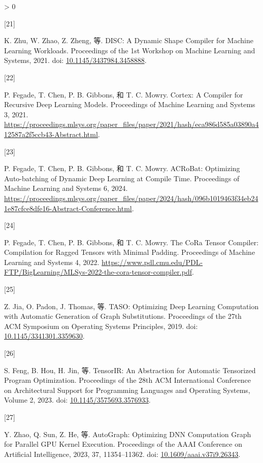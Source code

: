 \documentclass[
  UTF8,
  zihao=5]{ctexart}
\newlength{\cslhangindent}
\newlength{\csllabelwidth}
\newenvironment{CSLReferences}[2] %
 {%
  \setlength{\parindent}{0pt}
  \ifodd #1 \everypar{\setlength{\hangindent}{\cslhangindent}}\ignorespaces\fi
  \ifnum #2 > 0
  \setlength{\parskip}{#2\baselineskip}
  \fi
 }%
 {}
\newcommand{\CSLLeftMargin}[1]{\parbox[t]{\csllabelwidth}{#1}}
\newcommand{\CSLRightInline}[1]{\parbox[t]{\linewidth - \csllabelwidth}{#1}\par}
\begin{document}
\begin{CSLReferences}{0}{0}
\leavevmode{}%
\CSLLeftMargin{{[}21{]} }%
\CSLRightInline{K. Zhu, W. Zhao, Z. Zheng, 等. {DISC: A Dynamic Shape
Compiler for Machine Learning Workloads}. Proceedings of the 1st
Workshop on Machine Learning and Systems, 2021. doi:
\href{https://doi.org/10.1145/3437984.3458888}{10.1145/3437984.3458888}.}

\leavevmode{}%
\CSLLeftMargin{{[}22{]} }%
\CSLRightInline{P. Fegade, T. Chen, P. B. Gibbons, 和 T. C. Mowry.
{Cortex: A Compiler for Recursive Deep Learning Models}. Proceedings of
Machine Learning and Systems 3, 2021.
\url{https://proceedings.mlsys.org/paper_files/paper/2021/hash/eca986d585a03890a412587a2f5ccb43-Abstract.html}.}

\leavevmode{}%
\CSLLeftMargin{{[}23{]} }%
\CSLRightInline{P. Fegade, T. Chen, P. B. Gibbons, 和 T. C. Mowry.
{ACRoBat: Optimizing Auto-batching of Dynamic Deep Learning at Compile
Time}. Proceedings of Machine Learning and Systems 6, 2024.
\url{https://proceedings.mlsys.org/paper_files/paper/2024/hash/096b1019463f34eb241e87cfce8dfe16-Abstract-Conference.html}.}

\leavevmode{}%
\CSLLeftMargin{{[}24{]} }%
\CSLRightInline{P. Fegade, T. Chen, P. B. Gibbons, 和 T. C. Mowry. {The
CoRa Tensor Compiler: Compilation for Ragged Tensors with Minimal
Padding}. Proceedings of Machine Learning and Systems 4, 2022.
\url{https://www.pdl.cmu.edu/PDL-FTP/BigLearning/MLSys-2022-the-cora-tensor-compiler.pdf}.}

\leavevmode{}%
\CSLLeftMargin{{[}25{]} }%
\CSLRightInline{Z. Jia, O. Padon, J. Thomas, 等. {TASO: Optimizing Deep
Learning Computation with Automatic Generation of Graph Substitutions}.
Proceedings of the 27th ACM Symposium on Operating Systems Principles,
2019. doi:
\href{https://doi.org/10.1145/3341301.3359630}{10.1145/3341301.3359630}.}

\leavevmode{}%
\CSLLeftMargin{{[}26{]} }%
\CSLRightInline{S. Feng, B. Hou, H. Jin, 等. {TensorIR: An Abstraction
for Automatic Tensorized Program Optimization}. Proceedings of the 28th
ACM International Conference on Architectural Support for Programming
Languages and Operating Systems, Volume 2, 2023. doi:
\href{https://doi.org/10.1145/3575693.3576933}{10.1145/3575693.3576933}.}

\leavevmode{}%
\CSLLeftMargin{{[}27{]} }%
\CSLRightInline{Y. Zhao, Q. Sun, Z. He, 等. AutoGraph: Optimizing DNN
Computation Graph for Parallel GPU Kernel Execution. Proceedings of the
AAAI Conference on Artificial Intelligence, 2023, 37, 11354--11362. doi:
\href{https://doi.org/10.1609/aaai.v37i9.26343}{10.1609/aaai.v37i9.26343}.}


\end{CSLReferences}
\end{document}
